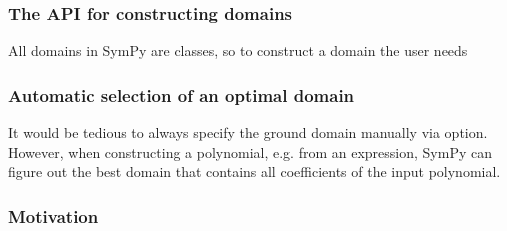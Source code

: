 \subsubsection{The API for constructing domains}

All domains in SymPy are classes, so to construct a domain the user needs


\subsubsection{Automatic selection of an optimal domain}

It would be tedious to always specify the ground domain manually via  option. However,
when constructing a polynomial, e.g. from an expression, SymPy can figure out the best domain
that contains all coefficients of the input polynomial.


\subsubsection{Motivation}

